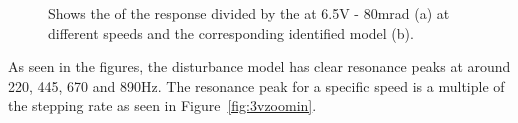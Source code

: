 \begin{figure}[h!]
  \centering %
  \qquad
  \caption{\label{fig:fft_6_5_modelfit} Shows the \abbrFFT of the response divided by the \abbrFFT at 6.5V - 80mrad (a) at different speeds and the corresponding identified model (b).}
\end{figure}

As seen in the figures, the disturbance model has clear resonance peaks at around 220, 445, 670 and 890Hz. The resonance peak for a specific speed is a multiple of the stepping rate as seen in Figure~\ref{fig:3vzoomin}.

